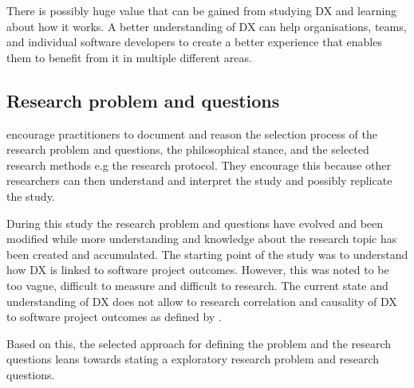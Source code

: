 \documentclass[english, 12pt, a4paper, sci, utf8, a-1b, online]{aaltothesis}
\begin{document}
There is possibly huge value that can be gained from studying DX and learning about how it works. A better understanding of DX can help organisations, teams, and individual software developers to create a better experience that enables them to benefit from it in multiple different areas.


\subsection{Research problem and questions}

\cite{easterbrook2008selecting} encourage practitioners to document and reason the selection process of the research problem and questions, the philosophical stance, and the selected research methods e.g the research protocol. They encourage this because other researchers can then understand and interpret the study and possibly replicate the study.

During this study the research problem and questions have evolved and been modified while more understanding and knowledge about the research topic has been created and accumulated. The starting point of the study was to understand how DX is linked to software project outcomes. However, this was noted to be too vague, difficult to measure and difficult to research. The current state and understanding of DX does not allow to research correlation and causality of DX to software project outcomes as defined by \cite{easterbrook2008selecting}.

Based on this, the selected approach for defining the problem and the research questions leans towards stating a exploratory research problem and research questions.
\end{document}
